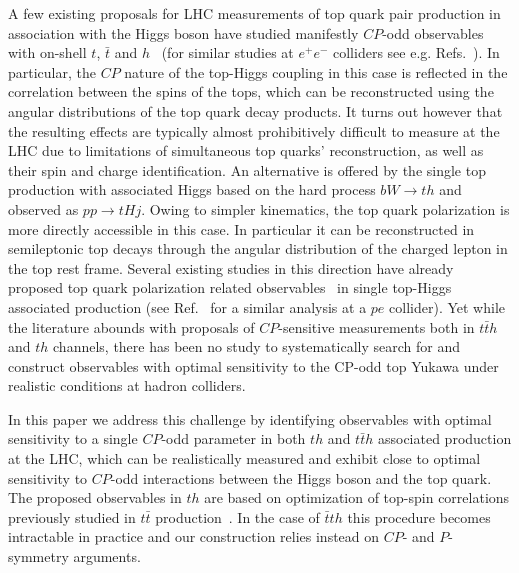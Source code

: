\documentclass[11pt,a4paper]{article}
\begin{document}
A few existing proposals for LHC measurements of top quark pair production in association with the Higgs boson have studied manifestly $CP$-odd observables with on-shell $t$, $\bar t$ and $h$~\cite{hep-ph/9501339, Ellis:2013yxa, 1407.5089, Boudjema:2015nda, 1507.07926, 1603.03632, Gritsan:2016hjl, Li:2017dyz, AmorDosSantos:2017ayi, 1804.05874} (for similar studies at $e^+e^-$ colliders see e.g. Refs.~\cite{hep-ph/9605326,BhupalDev:2007ftb}). In particular, the $CP$ nature of the top-Higgs coupling in this case is reflected in the correlation between the spins of the tops, which can be reconstructed using the angular distributions of the top quark decay products. It turns out however that the resulting effects are typically almost prohibitively difficult to measure at the LHC due to limitations of simultaneous top quarks' reconstruction, as well as their spin and charge identification. An alternative is offered by the single top production with associated Higgs based on the hard process $b W \to t h$ and observed as $pp \to t H j$. Owing to simpler kinematics, the top quark polarization is more directly accessible in this case. In particular it can be reconstructed in semileptonic top decays through the angular distribution of the charged lepton in the top rest frame. Several existing studies in this direction have already proposed top quark polarization related observables~\cite{Ellis:2013yxa,Kobakhidze:2014gqa,1410.2701,1504.00611,1807.00281,Kraus:2019myc} in single top-Higgs associated production (see Ref.~\cite{Coleppa:2017rgb} for a similar analysis at a $pe$ collider). Yet while the literature abounds with proposals of $CP$-sensitive measurements both in $t\bar{t} h$ and $t h$ channels, there has been no study to systematically search for and construct observables with optimal sensitivity to the CP-odd top Yukawa under realistic conditions at hadron colliders.

In this paper we address this challenge by identifying observables with optimal sensitivity to a single $CP$-odd parameter in both $th$ and $t \bar{t} h$ associated production at the LHC, which can be realistically measured and exhibit close to optimal sensitivity to $CP$-odd interactions between the Higgs boson and the top quark. The proposed observables in $th$ are based on optimization of top-spin correlations previously studied in $t\bar t$ production~\cite{Fajfer:2012si}. In the case of $\bar t t h$ this procedure becomes intractable in practice and our construction relies instead on $CP$- and $P$-symmetry arguments.
\end{document}
